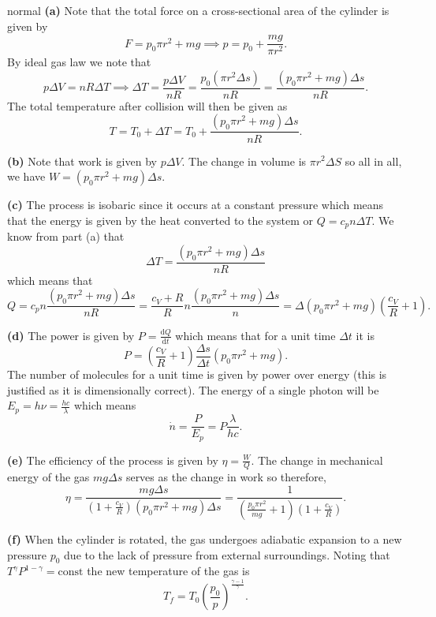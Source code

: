 \begin{solution}{normal}
\textbf{(a)} Note that the total force on a cross-sectional area of the cylinder is given by 
\[F = p_0 \pi r^2 + mg\implies p = p_0 + \frac{mg}{\pi r^2}.\]
By ideal gas law we note that 
\[p\Delta V = nR\Delta T \implies \Delta T = \frac{p\Delta V}{nR} = \frac{p_0 (\pi r^2\Delta s)}{nR} = \frac{(p_0\pi r^2+ mg)\Delta s}{nR}.\]
The total temperature after collision will then be given as 
\[T = T_0 + \Delta T = T_0 + \frac{(p_0 \pi r^2 + mg)\Delta s}{nR}.\]
\vspace{3mm}

\noindent \textbf{(b)} Note that work is given by $p\Delta V$. The change in volume is $\pi r^2 \Delta S$ so all in all, we have $W = (p_0\pi r^2 + mg)\Delta s$.
\vspace{3mm}

\noindent \textbf{(c)} The process is isobaric since it occurs at a constant pressure which means that the energy is given by the heat converted to the system or $Q = c_p n \Delta T$. We know from part (a) that
\[\Delta T =  \frac{(p_0\pi r^2 + mg)\Delta s}{nR}\]
which means that
\[Q = c_p n \frac{(p_0\pi r^2 + mg)\Delta s}{nR} = \frac{c_V + R}{R} n\frac{(p_0\pi r^2 + mg)\Delta s}{n} = \Delta (p_0 \pi r^2 + mg)\left(\frac{c_V}{R} + 1\right).\]
\vspace{3mm}

\noindent \textbf{(d)} The power is given by $P = \frac{\text{d}Q}{\text{d}t}$ which means that for a unit time $\Delta t$ it is 
\[P = \left(\frac{c_V}{R} + 1\right) \frac{\Delta s}{\Delta t} (p_0 \pi r^2 + mg).\]
The number of molecules for a unit time is given by power over energy (this is justified as it is dimensionally correct). The energy of a single photon will be $E_p = h\nu = \frac{hc}{\lambda}$ which means 
\[\dot{n} = \frac{P}{E_p} = P \frac{\lambda}{hc}.\]
\vspace{3mm}

\noindent \textbf{(e)} The efficiency of the process is given by $\eta = \frac{W}{Q}$. The change in mechanical energy of the gas $mg\Delta s$ serves as the change in work so therefore, 
\[\eta = \frac{mg\Delta s}{\left(1 + \frac{c_V}{R}\right)(p_0 \pi r^2 + mg)\Delta s} = \frac{1}{\left(\frac{p_0 \pi r^2}{mg} + 1\right) \left(1 + \frac{c_V}{R}\right)}.\]
\vspace{3mm}

\noindent \textbf{(f)} When the cylinder is rotated, the gas undergoes adiabatic expansion to a new pressure $p_0$ due to the lack of pressure from external surroundings. Noting that $T^{\gamma}P^{1 - \gamma} = \text{const}$ the new temperature of the gas is 
\[T_f = T_0 \left(\frac{p_0}{p}\right)^{\frac{\gamma - 1}{\gamma}}.\]
\end{solution}